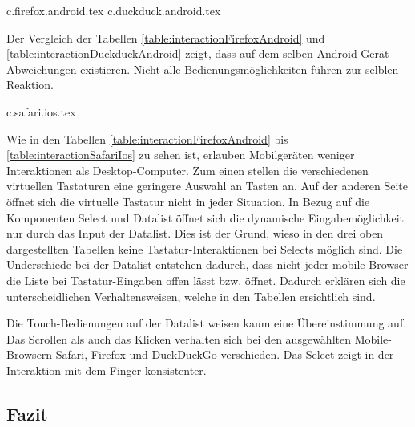 {c.firefox.android.tex}
{c.duckduck.android.tex}

Der Vergleich der Tabellen \ref{table:interactionFirefoxAndroid} und \ref{table:interactionDuckduckAndroid} zeigt, dass auf dem selben Android-Gerät Abweichungen existieren.
Nicht alle Bedienungsmöglichkeiten führen zur selblen Reaktion.

\clearpage
{c.safari.ios.tex}

Wie in den Tabellen \ref{table:interactionFirefoxAndroid} bis \ref{table:interactionSafariIos} zu sehen ist, erlauben Mobilgeräten weniger Interaktionen als Desktop-Computer.
Zum einen stellen die verschiedenen virtuellen Tastaturen eine geringere Auswahl an Tasten an.
Auf der anderen Seite öffnet sich die virtuelle Tastatur nicht in jeder Situation. 
In Bezug auf die Komponenten Select und Datalist öffnet sich die dynamische Eingabemöglichkeit nur durch das Input der Datalist.
Dies ist der Grund, wieso in den drei oben dargestellten Tabellen keine Tastatur-Interaktionen bei Selects möglich sind. 
Die Underschiede bei der Datalist entstehen dadurch, dass nicht jeder mobile Browser die Liste bei Tastatur-Eingaben offen lässt bzw. öffnet.
Dadurch erklären sich die unterscheidlichen Verhaltensweisen, welche in den Tabellen ersichtlich sind.

Die Touch-Bedienungen auf der Datalist weisen kaum eine Übereinstimmung auf. 
Das Scrollen als auch das Klicken verhalten sich bei den ausgewählten Mobile-Browsern Safari, Firefox und DuckDuckGo verschieden.
Das Select zeigt in der Interaktion mit dem Finger konsistenter. 


\clearpage
\subsection{Fazit}
\label{sec:summeryExisting}

